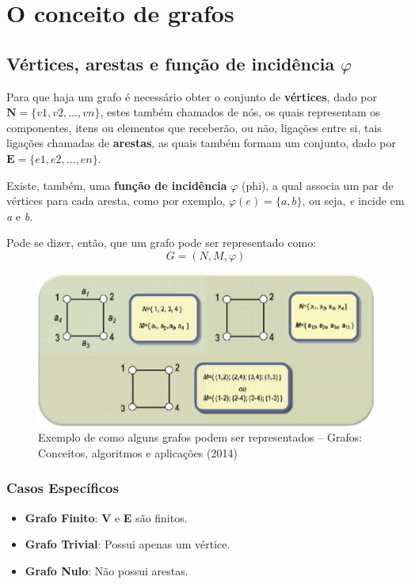 \documentclass[a4paper, 12pt]{article}
\begin{document}
\section{O conceito de grafos}
\subsection{Vértices, arestas e função de incidência {$\varphi$}}
Para que haja um grafo é necessário obter o conjunto de \textbf{vértices}, dado por $\textbf{N} = \{v1, v2, \ldots, vn\}$, estes também chamados de nós, os quais representam os componentes, itens ou elementos que receberão, ou não, ligações entre si, tais ligações chamadas de \textbf{arestas}, as quais também formam um conjunto, dado por $\textbf{E} = \{e1, e2, \ldots, en\}$.

Existe, também, uma \textbf{função de incidência} $ \varphi $ (phi), a qual associa um par de vértices para cada aresta, como por exemplo, $ \varphi(e) = \{ a, b \}$, ou seja, \textit{e} incide em \textit{a} e \textit{b}.

Pode se dizer, então, que um grafo pode ser representado como: \[ G = (N, M, \varphi) \]

	\begin{figure}[hbt]
		\centering
		\includegraphics[width=\linewidth]{exemplo.png}

		\caption{Exemplo de como alguns grafos podem ser representados -- Grafos: Conceitos, algoritmos e aplicações (2014) }
	\end{figure}


\subsubsection{Casos Específicos}

\begin{itemize}
	\item\textbf{Grafo Finito}:  \textbf{V} e \textbf{E} são finitos.
	\item\textbf{Grafo Trivial}: Possui apenas um vértice.
	\item\textbf{Grafo Nulo}: Não possui arestas.
\end{itemize}
\end{document}
